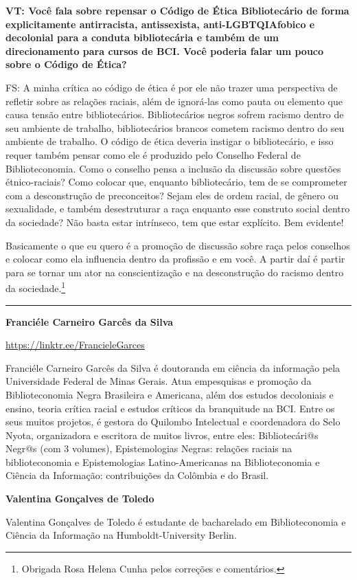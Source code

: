 \documentclass[a4paper,
fontsize=11pt,
oneside,
numbers=noperiodatend,
parskip=half-,
bibliography=totoc,
final
]{scrartcl}
\begin{document}
\textbf{VT: Você fala sobre repensar o Código de Ética Bibliotecário de
forma explicitamente antirracista, antissexista, anti-LGBTQIAfobico e
decolonial para a conduta bibliotecária e também de um direcionamento
para cursos de BCI. Você poderia falar um pouco sobre o Código de
Ética?}

FS: A minha crítica ao código de ética é por ele não trazer uma
perspectiva de refletir sobre as relações raciais, além de ignorá-las
como pauta ou elemento que causa tensão entre bibliotecários.
Bibliotecários negros sofrem racismo dentro de seu ambiente de trabalho,
bibliotecários brancos cometem racismo dentro do seu ambiente de
trabalho. O código de ética deveria instigar o bibliotecário, e isso
requer também pensar como ele é produzido pelo Conselho Federal de
Biblioteconomia. Como o conselho pensa a inclusão da discussão sobre
questões étnico-raciais? Como colocar que, enquanto bibliotecário, tem
de se comprometer com a desconstrução de preconceitos? Sejam eles de
ordem racial, de gênero ou sexualidade, e também desestruturar a raça
enquanto esse construto social dentro da sociedade? Não basta estar
intrínseco, tem que estar explícito. Bem evidente!

Basicamente o que eu quero é a promoção de discussão sobre raça pelos
conselhos e colocar como ela influencia dentro da profissão e em você. A
partir daí é partir para se tornar um ator na conscientização e na
desconstrução do racismo dentro da sociedade.\footnote{Obrigada Rosa
  Helena Cunha pelos correções e comentários.}

\begin{center}\rule{0.5\linewidth}{0.5pt}\end{center}

\textbf{Franciéle Carneiro Garcês da Silva}

\url{https://linktr.ee/FrancieleGarces}

Franciéle Carneiro Garcês da Silva é doutoranda em ciência da informação
pela Universidade Federal de Minas Gerais. Atua empesquisas e promoção
da Biblioteconomia Negra Brasileira e Americana, além dos estudos
decoloniais e ensino, teoria crítica racial e estudos críticos da
branquitude na BCI. Entre os seus muitos projetos, é gestora do Quilombo
Intelectual e coordenadora do Selo Nyota, organizadora e escritora de
muitos livros, entre eles: Bibliotecári@s Negr@s (com 3 volumes),
Epistemologias Negras: relações raciais na biblioteconomia e
Epistemologias Latino-Americanas na Biblioteconomia e Ciência da
Informação: contribuições da Colômbia e do Brasil.

\textbf{Valentina Gonçalves de Toledo}

Valentina Gonçalves de Toledo é estudante de bacharelado em
Biblioteconomia e Ciência da Informação na Humboldt-University Berlin.
\end{document}
